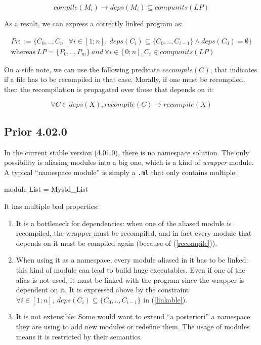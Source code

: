 \begin{equation}
compile(M_i) \rightarrow deps(M_i) \subseteq compunits(LP)
\label{compile}
\end{equation}

As a result, we can express a correctly linked program as:

\begin{multline}
Pr ::= \{ C_0, .., C_n ~|~ \forall i \in [1; n], ~deps(C_i) \subseteq \{ C_0, ..,
    C_{i-1} \} \land deps(C_0) = \emptyset \}\\
    \text{whereas} ~ LP = \{ P_0, .., P_m \}~and~\forall i \in [0; n], C_i \in compunits(LP)
\label{linkable}
\end{multline}


On a side note, we can use the following predicate $recompile(C)$, that
indicates if a file has to be recompiled in that case. Morally, if one must be
recompiled, then the recompilation is propagated over those that depends on it:

\begin{equation}
  \forall C \in deps(X), recompile(C) \rightarrow recompile(X)
\label{recompile}
\end{equation}

\subsection{Prior 4.02.0}

In the current stable version (4.01.0), there is no namespace solution. The only
possibility is aliasing modules into a big one, which is a kind of
\emph{wrapper} module. A typical ``namespace module'' is simply a \texttt{.ml}
that only contains multiple:

\begin{OCaml}
module List = Mystd_List
\end{OCaml}

It has multiple bad properties:
\begin{enumerate}
  \item It is a bottleneck for dependencies: when one of the aliased module is
    recompiled, the wrapper must be recompiled, and in fact every module that
    depends on it must be compiled again (because of (\ref{recompile})).
  \item When using it as a namespace, every module aliased in it has to be
    linked: this kind of module can lead to build huge executables. Even if one
    of the alias is not used, it must be linked with the program since the
    wrapper is dependent on it. It is expressed above by the constraint $
    \forall i \in [1; n], ~deps(C_i) \subseteq \{ C_0, .., C_{i-1} \}$ in
    (\ref{linkable}).
  \item It is not extensible: Some would want to extend ``a posteriori'' a
    namespace they are using to add new modules or redefine them. The usage of
    modules means it is restricted by their semantics.
\end{enumerate}

